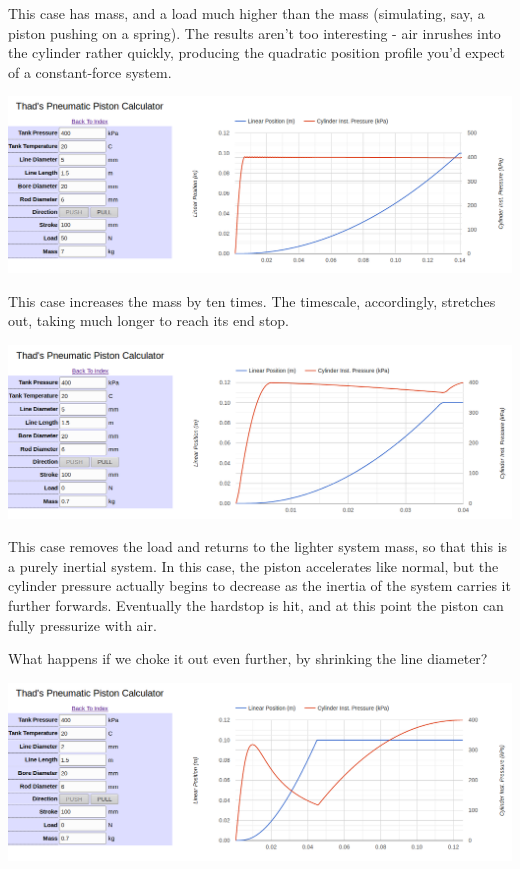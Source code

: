 \documentclass[10pt,letterpaper]{article}
\begin{document}
	This case has mass, and a load much higher than the mass (simulating, say, a piston pushing on a spring). The results aren't too interesting - air inrushes into the cylinder rather quickly, producing the quadratic position profile you'd expect of a constant-force system.
	
	\includegraphics[width=\textwidth]{pneu_case_2.png}
	
	This case increases the mass by ten times. The timescale, accordingly, stretches out, taking much longer to reach its end stop.
	
	\includegraphics[width=\textwidth]{pneu_case_3.png}
	
	This case removes the load and returns to the lighter system mass, so that this is a purely inertial system. In this case, the piston accelerates like normal, but the cylinder pressure actually begins to decrease as the inertia of the system carries it further forwards. Eventually the hardstop is hit, and at this point the piston can fully pressurize with air.
	
	What happens if we choke it out even further, by shrinking the line diameter?
	
	\includegraphics[width=\textwidth]{pneu_case_4.png}
	
\end{document}
